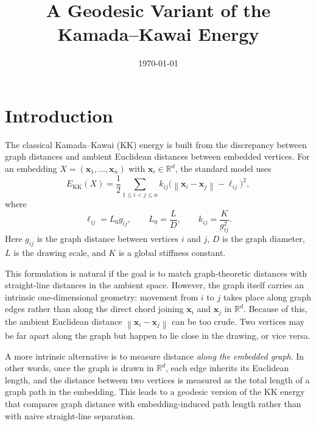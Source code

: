 \documentclass[11pt]{article}
\title{A Geodesic Variant of the Kamada--Kawai Energy}
\author{}
\date{\today}
\newcommand{\RR}{\mathbb{R}}
\newcommand{\norm}[1]{\left\lVert #1 \right\rVert}
\newcommand{\vect}[1]{\mathbf{#1}}
\begin{document}
\maketitle

\section*{Introduction}

The classical Kamada--Kawai (KK) energy is built from the discrepancy between graph
distances and ambient Euclidean distances between embedded vertices. For an embedding
$X = (\vect{x}_1,\dots,\vect{x}_n)$ with $\vect{x}_i \in \RR^d$, the standard model uses
\[
E_{\mathrm{KK}}(X)
=
\frac{1}{2}\sum_{1 \le i < j \le n}
k_{ij}\bigl(\norm{\vect{x}_i-\vect{x}_j}-\ell_{ij}\bigr)^2,
\]
where
\[
\ell_{ij} = L_0 g_{ij},
\qquad
L_0 = \frac{L}{D},
\qquad
k_{ij} = \frac{K}{g_{ij}^2}.
\]
Here $g_{ij}$ is the graph distance between vertices $i$ and $j$, $D$ is the graph
diameter, $L$ is the drawing scale, and $K$ is a global stiffness constant.

This formulation is natural if the goal is to match graph-theoretic distances with
straight-line distances in the ambient space. However, the graph itself carries an intrinsic
one-dimensional geometry: movement from $i$ to $j$ takes place along graph edges rather
than along the direct chord joining $\vect{x}_i$ and $\vect{x}_j$ in $\RR^d$. Because of this,
the ambient Euclidean distance $\norm{\vect{x}_i-\vect{x}_j}$ can be too crude. Two vertices
may be far apart along the graph but happen to lie close in the drawing, or vice versa.

A more intrinsic alternative is to measure distance \emph{along the embedded graph}. In
other words, once the graph is drawn in $\RR^d$, each edge inherits its Euclidean length,
and the distance between two vertices is measured as the total length of a graph path in the
embedding. This leads to a geodesic version of the KK energy that compares graph distance
with embedding-induced path length rather than with naive straight-line separation.
\end{document}
